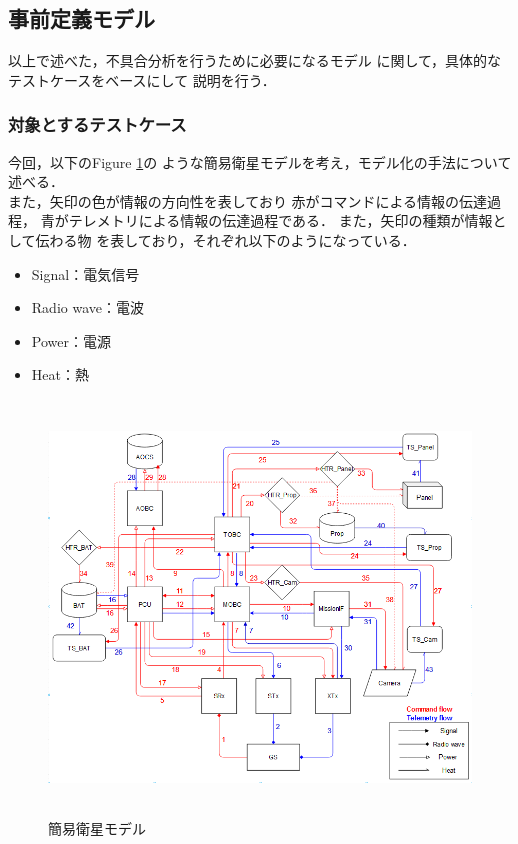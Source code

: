 \documentclass[11pt]{article}
\begin{document}
\subsection{事前定義モデル}
以上で述べた，不具合分析を行うために必要になるモデル
に関して，具体的なテストケースをベースにして
説明を行う．%

\subsubsection{対象とするテストケース}
今回，以下のFigure \ref{fig:simple_sat}の
ような簡易衛星モデルを考え，モデル化の手法について
述べる．\\
また，矢印の色が情報の方向性を表しており
赤がコマンドによる情報の伝達過程，
青がテレメトリによる情報の伝達過程である．
また，矢印の種類が情報として伝わる物
を表しており，それぞれ以下のようになっている．
\begin{itemize}
   \item Signal：電気信号
   \item Radio wave：電波
   \item Power：電源
   \item Heat：熱
\end{itemize}
\begin{figure}[H]
   \centering
      \includegraphics[height=11.0cm]{figure/satellite_diagram.PNG}
      \caption{簡易衛星モデル}
      \label{fig:simple_sat}
\end{figure}
\end{document}
